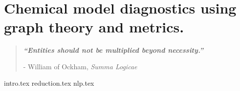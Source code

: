 

\chapter{ Chemical model diagnostics using graph theory and metrics.  }


\blankpage
\restoregeometry
\vspace*{0.15\paperheight}


\begin{center}
\begin{quotation}
  \large{\emph{\textbf{``Entities should not be multiplied beyond necessity.''} }  }  \\
  \begin{flushright}
  - William of Ockham, \textit{Summa Logicae}
  \end{flushright}
 \end{quotation}
\end{center}
\newpage

\doublespacing

 {intro.tex}
 {reduction.tex}
 {nlp.tex}
%    
 
\chapterbib

